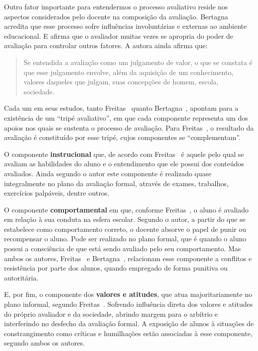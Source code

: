  Outro fator importante para entendermos o processo avaliativo reside nos aspectos considerados pelo docente na composição da avaliação. Bertagna~\cite{bertagna2006} acredita que esse processo sofre influências involuntárias e externas ao ambiente educacional. E afirma que o avaliador muitas vezes se apropria do poder de avaliação para controlar outros fatores. A autora ainda afirma que:

\begin{quote}
Se entendida a avaliação como um julgamento de valor, o que se constata é que esse julgamento envolve, além da aquisição de um conhecimento, valores daqueles que julgam, suas concepções de homem, escola, sociedade.~\cite{bertagna2006}
\end{quote}%

Cada um em seus estudos, tanto Freitas~\cite{de2003ciclos} quanto Bertagna~\cite{bertagna2006}, apontam para a existência de um ``tripé avaliativo'', em que cada componente representa um dos apoios nos quais se sustenta o processo de avaliação. Para Freitas~\cite{de2003ciclos}, o resultado da avaliação é constituído por esse tripé, cujos componentes se ``complementam''. 

O componente \textbf{instrucional} que, de acordo com Freitas~\cite{de2003ciclos} é aquele pelo qual se avaliam as habilidades do aluno e o entendimento que ele possui dos conteúdos avaliados. Ainda segundo o autor este componente é realizado quase integralmente no plano da avaliação formal, através de exames, trabalhos, exercícios palpáveis, dentre outros.


O componente \textbf{comportamental} em que, conforme Freitas~\cite{de2003ciclos}, o aluno é avaliado em relação à sua conduta na esfera escolar. Segundo o autor, a partir do que se estabelece como comportamento correto, o docente absorve o papel de punir ou recompensar o aluno. Pode ser realizado no plano formal, que é quando o aluno possui a consciência de que está sendo avaliado pelo seu comportamento. Mas ambos os autores, Freitas~\cite{de2003ciclos} e Bertagna~\cite{bertagna2006}, relacionam esse componente a conflitos e resistência por parte dos alunos, quando empregado de forma punitiva ou autoritária.

E, por fim, o componente dos \textbf{valores e atitudes}, que atua majoritariamente no plano informal, segundo Freitas~\cite{de2003ciclos}. Sofrendo influência direta dos valores e atitudes do próprio avaliador e da sociedade, abrindo margem para o arbítrio e interferindo no desfecho da avaliação formal. A exposição de alunos à situações de constrangimento como críticas e humilhações estão associadas à esse componente, segundo ambos os autores.

